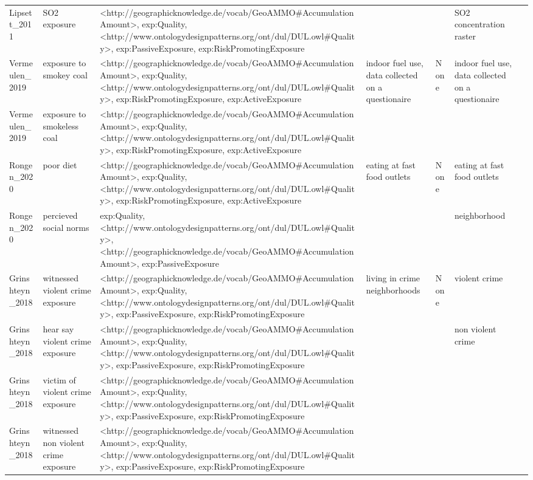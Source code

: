 \begin{tabular}{p{1cm}p{1cm}p{1cm}p{1cm}p{1cm}p{1cm}p{1cm}}
Lipsett\_2011 & SO2 exposure & <http://geographicknowledge.de/vocab/GeoAMMO\#AccumulationAmount>, exp:Quality, <http://www.ontologydesignpatterns.org/ont/dul/DUL.owl\#Quality>, exp:PassiveExposure, exp:RiskPromotingExposure &  &  & SO2 concentration raster &  \\
Vermeulen\_2019 & exposure to smokey coal & <http://geographicknowledge.de/vocab/GeoAMMO\#AccumulationAmount>, exp:Quality, <http://www.ontologydesignpatterns.org/ont/dul/DUL.owl\#Quality>, exp:RiskPromotingExposure, exp:ActiveExposure & indoor fuel use, data collected on a questionaire & None & indoor fuel use, data collected on a questionaire &  \\
Vermeulen\_2019 & exposure to smokeless coal & <http://geographicknowledge.de/vocab/GeoAMMO\#AccumulationAmount>, exp:Quality, <http://www.ontologydesignpatterns.org/ont/dul/DUL.owl\#Quality>, exp:RiskPromotingExposure, exp:ActiveExposure &  &  &  &  \\
Rongen\_2020 & poor diet & <http://geographicknowledge.de/vocab/GeoAMMO\#AccumulationAmount>, exp:Quality, <http://www.ontologydesignpatterns.org/ont/dul/DUL.owl\#Quality>, exp:RiskPromotingExposure, exp:ActiveExposure & eating at fast food outlets & None & eating at fast food outlets &  \\
Rongen\_2020 & percieved social norms & exp:Quality, <http://www.ontologydesignpatterns.org/ont/dul/DUL.owl\#Quality>, <http://geographicknowledge.de/vocab/GeoAMMO\#AccumulationAmount>, exp:PassiveExposure &  &  & neighborhood &  \\
Grinshteyn\_2018 & witnessed violent crime exposure & <http://geographicknowledge.de/vocab/GeoAMMO\#AccumulationAmount>, exp:Quality, <http://www.ontologydesignpatterns.org/ont/dul/DUL.owl\#Quality>, exp:PassiveExposure, exp:RiskPromotingExposure & living in crime neighborhoods & None & violent crime &  \\
Grinshteyn\_2018 & hear say violent crime exposure & <http://geographicknowledge.de/vocab/GeoAMMO\#AccumulationAmount>, exp:Quality, <http://www.ontologydesignpatterns.org/ont/dul/DUL.owl\#Quality>, exp:PassiveExposure, exp:RiskPromotingExposure &  &  & non violent crime &  \\
Grinshteyn\_2018 & victim of violent crime exposure & <http://geographicknowledge.de/vocab/GeoAMMO\#AccumulationAmount>, exp:Quality, <http://www.ontologydesignpatterns.org/ont/dul/DUL.owl\#Quality>, exp:PassiveExposure, exp:RiskPromotingExposure &  &  &  &  \\
Grinshteyn\_2018 & witnessed non violent crime exposure & <http://geographicknowledge.de/vocab/GeoAMMO\#AccumulationAmount>, exp:Quality, <http://www.ontologydesignpatterns.org/ont/dul/DUL.owl\#Quality>, exp:PassiveExposure, exp:RiskPromotingExposure &  &  &  &  \\

\end{tabular}
